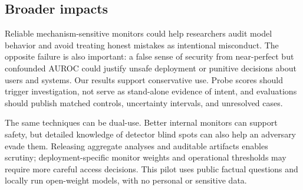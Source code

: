 \subsection{Broader impacts}

Reliable mechanism-sensitive monitors could help researchers audit model behavior and avoid treating honest mistakes as intentional misconduct. The opposite failure is also important: a false sense of security from near-perfect but confounded AUROC could justify unsafe deployment or punitive decisions about users and systems. Our results support conservative use. Probe scores should trigger investigation, not serve as stand-alone evidence of intent, and evaluations should publish matched controls, uncertainty intervals, and unresolved cases.

The same techniques can be dual-use. Better internal monitors can support safety, but detailed knowledge of detector blind spots can also help an adversary evade them. Releasing aggregate analyses and auditable artifacts enables scrutiny; deployment-specific monitor weights and operational thresholds may require more careful access decisions. This pilot uses public factual questions and locally run open-weight models, with no personal or sensitive data.

